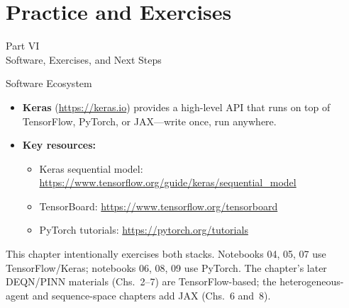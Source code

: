 \documentclass[aspectratio=169,11pt]{beamer}
\newcommand{\emphc}[1]{\textcolor{harvardcrimson}{#1}}
\begin{document}

\section{Practice and Exercises}

\begin{frame}{}
\begin{center}
{\Huge \textcolor{uzhblue}{Part VI}}\\[0.8em]
{\LARGE Software, Exercises, and Next Steps}
\end{center}
\end{frame}

\begin{frame}{Software Ecosystem}
\begin{center}
\end{center}

\vspace{0.5cm}
\begin{itemize}
    \item \textbf{Keras} (\url{https://keras.io}) provides a high-level API that runs on top of TensorFlow, PyTorch, or JAX---write once, run anywhere.
    \item \textbf{Key resources:}
    \begin{itemize}
        \item Keras sequential model: \url{https://www.tensorflow.org/guide/keras/sequential_model}
        \item TensorBoard: \url{https://www.tensorflow.org/tensorboard}
        \item PyTorch tutorials: \url{https://pytorch.org/tutorials}
    \end{itemize}
\end{itemize}

\vspace{0.3cm}
{\footnotesize\emphc{This chapter intentionally exercises both stacks.} Notebooks 04, 05, 07 use \emphc{TensorFlow/Keras}; notebooks 06, 08, 09 use \emphc{PyTorch}. The chapter's later DEQN/PINN materials (Chs.~2--7) are TensorFlow-based; the heterogeneous-agent and sequence-space chapters add JAX (Chs.~6 and~8).}
\end{frame}
\end{document}
